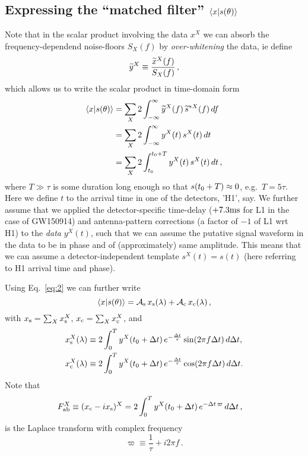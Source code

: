 \documentclass[aps,prd,onecolumn,notitlepage,nofootinbib,superscriptaddress,altaffilletter,floatfix]{revtex4-1}
\begin{document}
\subsection{Expressing the ``matched filter'' $\langle x|s(\theta)\rangle$}
\label{sec:computing-scalarxs}

Note that in the scalar product involving the data $x^X$ we can absorb the frequency-dependend noise-floors $S_X(f)$ by \emph{over-whitening} the
data, ie define
\begin{equation}
  \label{eq:12}
  \widetilde{y}^X \equiv \frac{\widetilde{x}^X(f)}{S_X(f)}\,,
\end{equation}
which allows us to write the scalar product in time-domain form
\begin{align}
  \label{eq:13}
  \langle x|s(\theta)\rangle &= \sum_X 2\int_{-\infty}^{\infty} \widetilde{y}^X(f)\,\widetilde{s}^{*X}(f)\,df \\
  &= \sum_X 2\int_{-\infty}^{\infty} y^X(t)\,s^X(t)\,dt \\
  &= \sum_X 2\int_{t_0}^{t_0 + T} y^X(t)\,s^X(t)\,dt\,,
\end{align}
where $T \gg \tau$ is some duration long enough so that $s(t_0+T)\approx0$, e.g.\ $T=5\tau$. Here we define $t$ to the arrival time in one of
the detectors, 'H1', say. We further assume that we applied the detector-specific time-delay ($+7.3\mathrm{ms}$ for L1 in the case of GW150914) and
antenna-pattern corrections (a factor of $-1$ of L1 wrt H1) to the \emph{data} $y^X(t)$, such that we can assume the putative signal waveform in the
data to be in phase and of (approximately) same amplitude. This means that we can assume a detector-independent template $s^X(t) = s(t)$ (here
referring to H1 arrival time and phase).

Using Eq.~\eqref{eq:2} we can further write
\begin{equation}
  \label{eq:9}
  \langle x|s(\theta)\rangle = \mathcal{A}_{\mathrm{s}}\,x_{\mathrm{s}}(\lambda) + \mathcal{A}_{\mathrm{c}}\,x_{\mathrm{c}}(\lambda)\,,
\end{equation}
with $x_{\mathrm{s}}=\sum_X x_{\mathrm{s}}^X$, $x_{\mathrm{c}}=\sum_X x_{\mathrm{c}}^X$, and
\begin{align}
  \label{eq:10}
  x_{\mathrm{s}}^X(\lambda) &\equiv 2\int_{0}^{T} y^X(t_0+\Delta t)\,e^{-\frac{\Delta t}{\tau}}\sin(2\pi f\Delta t)\,d\Delta t,\\
  x_{\mathrm{c}}^X(\lambda) &\equiv 2\int_{0}^{T} y^X(t_0+\Delta t)\,e^{-\frac{\Delta t}{\tau}}\cos(2\pi f\Delta t)\,d\Delta t.\\
\end{align}
Note that
\begin{align}
  \label{eq:16}
  F_{\mathrm{ab}}^X \equiv (x_{\mathrm{c}} - ix_{\mathrm{s}})^X &= 2 \int_{0}^{T} y^X(t_0+\Delta t)\,e^{-\Delta t \,\varpi}\,d\Delta t\,,
\end{align}
is the Laplace transform with complex frequency
\begin{equation}
  \label{eq:27}
  \varpi \equiv \frac{1}{\tau} + i2\pi f\,.
\end{equation}
\end{document}
